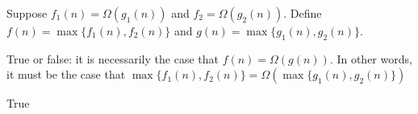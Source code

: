 \begin{prob}
    Suppose $f_1(n) = \Omega(g_1(n))$ and $f_2 = \Omega(g_2(n))$.
    Define $f(n) = \max \{ f_1(n), f_2(n) \}$ and $g(n) = \max \{ g_1(n), g_2(n)\}$.

    True or false: it is necessarily the case that $f(n) = \Omega(g(n))$.
    In other words, it must be the case that
    $
    \max \{ f_1(n), f_2(n) \} = \Omega ( \max\{ g_1(n), g_2(n) \} )
    $

     \Tf{}

     \begin{soln}
        True
     \end{soln}
\end{prob}
